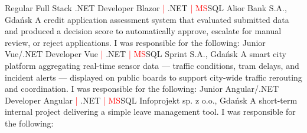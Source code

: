 \documentclass{cvClass} %
\begin{document}
   { %
      \experience
        {Regular Full Stack .NET Developer}
        {Blazor \textcolor{red}{|} .NET \textcolor{red}{| MS}SQL}
        {Alior Bank S.A., Gdańsk}
        {A credit application assessment system that evaluated submitted data and produced a decision score to automatically approve, escalate for manual review, or reject applications.}
        {I was responsible for the following:} {
        }
    }
   { %
      \experience
        {Junior Vue/.NET Developer}
        {Vue \textcolor{red}{|} .NET \textcolor{red}{| MS}SQL}
        {Sprint S.A., Gdańsk}
        {A smart city platform aggregating real-time sensor data — traffic conditions, tram delays, and incident alerts — displayed on public boards to support city-wide traffic rerouting and coordination.}
        {I was responsible for the following:} {
        }
    }
   { %
      \experience
        {Junior Angular/.NET Developer}
        {Angular \textcolor{red}{|} .NET \textcolor{red}{| MS}SQL}
        {Infoprojekt sp. z o.o., Gdańsk}
        {A short-term internal project delivering a simple leave management tool.}
        {I was responsible for the following:} {
        }
    }
\end{document}
